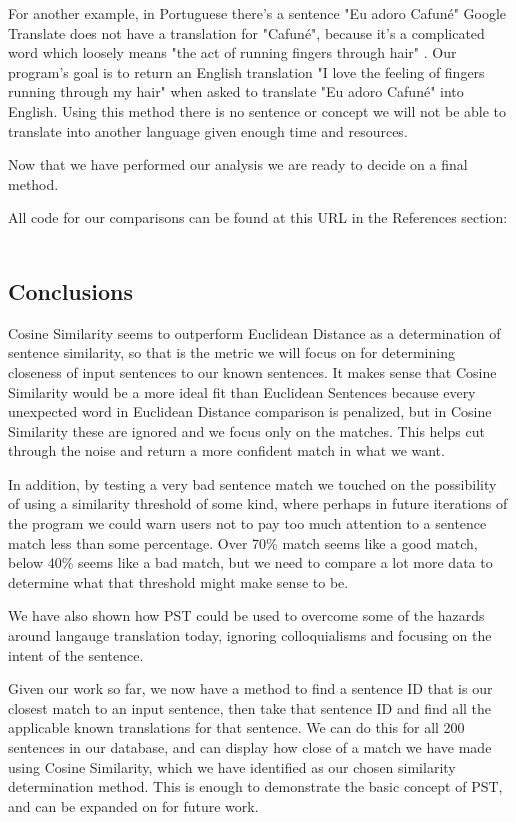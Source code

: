\documentclass[runningheads]{llncs}
\begin{document}
For another example, in Portuguese there's a sentence "Eu adoro Cafuné" Google Translate does not have a translation for "Cafuné", because it's a complicated word which loosely means "the act of running fingers through hair" . Our program's goal is to return an English translation "I love the feeling of fingers running through my hair" when asked to translate "Eu adoro Cafuné" into English. Using this method there is no sentence or concept we will not be able to translate into another language given enough time and resources.

	Now that we have performed our analysis we are ready to decide on a final method.

	All code for our comparisons can be found at this URL in the References section: ~\cite{ref_url20}
	
	\subsection{Conclusions}
	Cosine Similarity seems to outperform Euclidean Distance as a determination of sentence similarity, so that is the metric we will focus on for determining closeness of input sentences to our known sentences. It makes sense that Cosine Similarity would be a more ideal fit than Euclidean Sentences because every unexpected word in Euclidean Distance comparison is penalized, but in Cosine Similarity these are ignored and we focus only on the matches. This helps cut through the noise and return a more confident match in what we want.

	In addition, by testing a very bad sentence match we touched on the possibility of using a similarity threshold of some kind, where perhaps in future iterations of the program we could warn users not to pay too much attention to a sentence match less than some percentage. Over 70\% match seems like a good match, below 40\% seems like a bad match, but we need to compare a lot more data to determine what that threshold might make sense to be.

	We have also shown how PST could be used to overcome some of the hazards around langauge translation today, ignoring colloquialisms and focusing on the intent of the sentence.

	Given our work so far, we now have a method to find a sentence ID that is our closest match to an input sentence, then take that sentence ID and find all the applicable known translations for that sentence. We can do this for all 200 sentences in our database, and can display how close of a match we have made using Cosine Similarity, which we have identified as our chosen similarity determination method. This is enough to demonstrate the basic concept of PST, and can be expanded on for future work.
\end{document}
